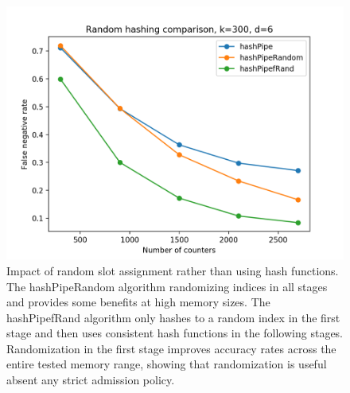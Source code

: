 \begin{figure}[t]
  \centering
    \includegraphics[scale=0.5]{random}
     \caption{Impact of random slot assignment rather than using hash functions. The hashPipeRandom algorithm randomizing indices in all stages and provides some benefits at high memory sizes. The hashPipefRand algorithm only hashes to a random index in the first stage and then uses consistent hash functions in the following stages. Randomization in the first stage improves accuracy rates across the entire tested memory range, showing that randomization is useful absent any strict admission policy.}
     \label{fig:bp-image}
\end{figure}

